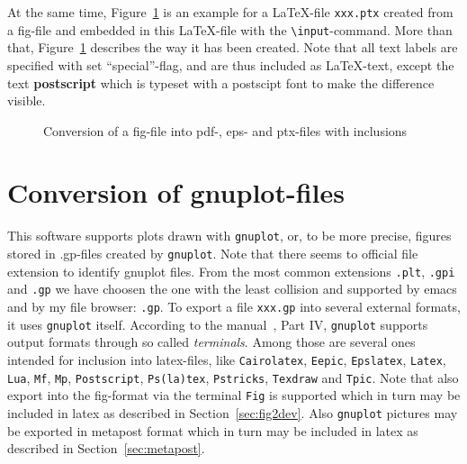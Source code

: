 \documentclass[12pt]{book}
\begin{document}
At the same time, Figure~\ref{fig:fig2dev} is an example 
for a \LaTeX-file \texttt{xxx.ptx} created from a fig-file 
and embedded in this \LaTeX-file 
with the {\tt\textbackslash input}-command. 
More than that, 
Figure~\ref{fig:fig2dev} describes the way it has been created. 
Note that all text labels are specified with set ``special''-flag, 
and are thus included as \LaTeX-text, 
except the text {\bf\tiny postscript} 
which is typeset with a postscipt font to make the difference visible. 


\begin{figure}[htb]
\begin{center}
\end{center}
\caption{\label{fig:fig2dev}Conversion of a fig-file 
into pdf-, eps- and ptx-files with inclusions}
\end{figure}


\section{Conversion of gnuplot-files}\label{sec:gnuplot2pdf}

This software supports plots drawn with \texttt{gnuplot}, or, to be more precise, 
figures stored in .gp-files created by \texttt{gnuplot}. 
Note that there seems to official file extension 
to identify gnuplot files. 
From the most common extensions {\tt.plt}, {\tt.gpi} and {\tt.gp} 
we have choosen the one with the least collision 
and supported by emacs and by my file browser: {\tt.gp}. 
To export a file \texttt{xxx.gp} into several external formats, 
it uses \texttt{gnuplot} itself. 
According to the manual~\cite{GnuPlot}, Part IV, 
\texttt{gnuplot} supports output formats through so called {\em terminals}. 
Among those are several ones intended for inclusion into latex-files, 
like \texttt{Cairolatex}, \texttt{Eepic}, \texttt{Epslatex}, \texttt{Latex}, \texttt{Lua}, 
\texttt{Mf}, \texttt{Mp}, \texttt{Postscript}, \texttt{Ps(la)tex}, \texttt{Pstricks}, 
\texttt{Texdraw} and \texttt{Tpic}. 
Note that also export into the fig-format via the terminal \texttt{Fig} 
is supported which in turn may be included in latex 
as described in Section~\ref{sec:fig2dev}. 
Also \texttt{gnuplot} pictures may be exported in metapost format 
which in turn may be included in latex 
as described in Section~\ref{sec:metapost}. 
\end{document}
